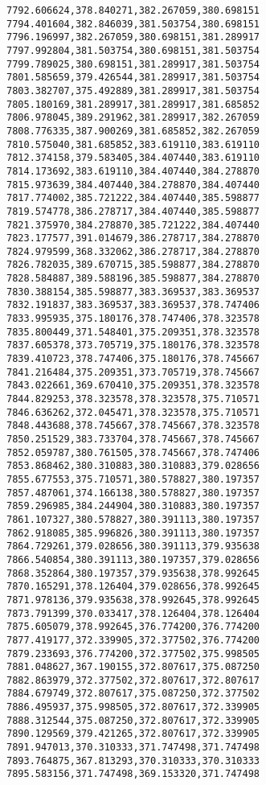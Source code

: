 \documentclass[11pt]{article}
\begin{document}
\begin{Verbatim}[commandchars=\\\{\}]
7792.606624,378.840271,382.267059,380.698151
7794.401604,382.846039,381.503754,380.698151
7796.196997,382.267059,380.698151,381.289917
7797.992804,381.503754,380.698151,381.503754
7799.789025,380.698151,381.289917,381.503754
7801.585659,379.426544,381.289917,381.503754
7803.382707,375.492889,381.289917,381.503754
7805.180169,381.289917,381.289917,381.685852
7806.978045,389.291962,381.289917,382.267059
7808.776335,387.900269,381.685852,382.267059
7810.575040,381.685852,383.619110,383.619110
7812.374158,379.583405,384.407440,383.619110
7814.173692,383.619110,384.407440,384.278870
7815.973639,384.407440,384.278870,384.407440
7817.774002,385.721222,384.407440,385.598877
7819.574778,386.278717,384.407440,385.598877
7821.375970,384.278870,385.721222,384.407440
7823.177577,391.014679,386.278717,384.278870
7824.979599,368.332062,386.278717,384.278870
7826.782035,389.670715,385.598877,384.278870
7828.584887,389.588196,385.598877,384.278870
7830.388154,385.598877,383.369537,383.369537
7832.191837,383.369537,383.369537,378.747406
7833.995935,375.180176,378.747406,378.323578
7835.800449,371.548401,375.209351,378.323578
7837.605378,373.705719,375.180176,378.323578
7839.410723,378.747406,375.180176,378.745667
7841.216484,375.209351,373.705719,378.745667
7843.022661,369.670410,375.209351,378.323578
7844.829253,378.323578,378.323578,375.710571
7846.636262,372.045471,378.323578,375.710571
7848.443688,378.745667,378.745667,378.323578
7850.251529,383.733704,378.745667,378.745667
7852.059787,380.761505,378.745667,378.747406
7853.868462,380.310883,380.310883,379.028656
7855.677553,375.710571,380.578827,380.197357
7857.487061,374.166138,380.578827,380.197357
7859.296985,384.244904,380.310883,380.197357
7861.107327,380.578827,380.391113,380.197357
7862.918085,385.996826,380.391113,380.197357
7864.729261,379.028656,380.391113,379.935638
7866.540854,380.391113,380.197357,379.028656
7868.352864,380.197357,379.935638,378.992645
7870.165291,378.126404,379.028656,378.992645
7871.978136,379.935638,378.992645,378.992645
7873.791399,370.033417,378.126404,378.126404
7875.605079,378.992645,376.774200,376.774200
7877.419177,372.339905,372.377502,376.774200
7879.233693,376.774200,372.377502,375.998505
7881.048627,367.190155,372.807617,375.087250
7882.863979,372.377502,372.807617,372.807617
7884.679749,372.807617,375.087250,372.377502
7886.495937,375.998505,372.807617,372.339905
7888.312544,375.087250,372.807617,372.339905
7890.129569,379.421265,372.807617,372.339905
7891.947013,370.310333,371.747498,371.747498
7893.764875,367.813293,370.310333,370.310333
7895.583156,371.747498,369.153320,371.747498

\end{Verbatim}
\end{document}
